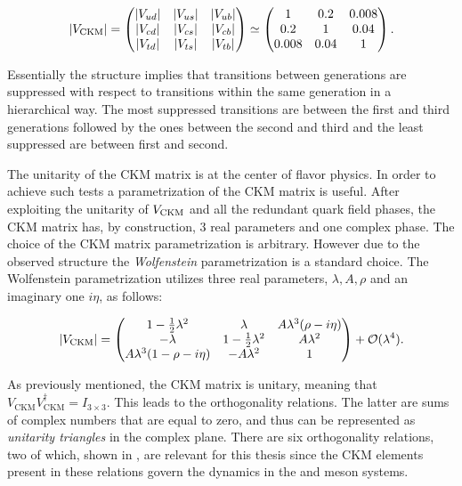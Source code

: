 \begin{equation}
  |V_{\text{CKM}}|
                   = \begin{pmatrix} |V_{ud}| & |V_{us}| & |V_{ub}| \\ |V_{cd}| & |V_{cs}| & |V_{cb}| \\ |V_{td}| & |V_{ts}| & |V_{tb}| \end{pmatrix}
              \simeq \begin{pmatrix} 1 & 0.2 & 0.008 \\ 0.2 & 1 & 0.04 \\ 0.008 & 0.04 & 1 \end{pmatrix}.
      \label{CKMmatrix}
  \end{equation}

\noindent Essentially the structure implies that transitions between generations
are suppressed with respect to transitions within the same generation in a hierarchical way. The most suppressed transitions are between
the first and third generations followed by the ones between the second and third and the least suppressed are between first and second.

The unitarity of the CKM matrix is at the center of flavor physics. In order to achieve such tests a
parametrization of the CKM matrix is useful. After exploiting the unitarity of $V_{\rm CKM}$ and all the
redundant quark field phases, the CKM matrix has, by construction, 3 real parameters and one complex phase.
The choice of the CKM matrix parametrization is \aprior arbitrary. However due to the observed structure the
{\it Wolfenstein} \cite{Wolfenstein:1983yz,Buras-wolfenstein} parametrization is a standard choice.
The Wolfenstein parametrization utilizes three real parameters, $\lambda,A,\rho$ and an imaginary one $i\eta$, as follows:

\begin{equation}
\centering
  |V_{\text{CKM}}|
                   = \begin{pmatrix} \VudWolf & \VusWolf & \VubWolf \\
                                     \VcdWolf & \VcsWolf & \VcbWolf \\
                                     \VtdWolf & \VtsWolf & \VtbWolf \end{pmatrix} + \mathcal{O}(\lambda^4).
      \label{CKMwolfenstein}
\end{equation}

\noindent As previously mentioned, the CKM matrix is unitary, meaning that $V_{\text{CKM}} V_{\text{CKM}}^\dagger = I_{3\times3}$.
This leads to the orthogonality relations. The latter are sums of complex numbers that are equal to zero,
and thus can be represented as {\it unitarity triangles} in the complex plane. There are six orthogonality relations, two of which, shown
in , are relevant for this thesis since the CKM elements present in these relations govern the
dynamics in the \Bs and \Bd meson systems.

